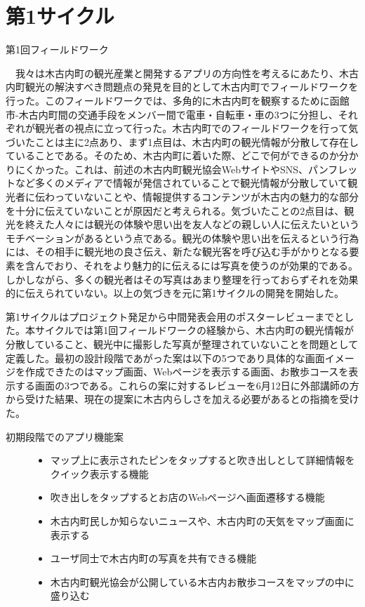 \section{第1サイクル}

\begin{description}
\item[第1回フィールドワーク]\mbox{}
\end{description}
　我々は木古内町の観光産業と開発するアプリの方向性を考えるにあたり、木古内町観光の解決すべき問題点の発見を目的として木古内町でフィールドワークを行った。このフィールドワークでは、多角的に木古内町を観察するために函館市-木古内町間の交通手段をメンバー間で電車・自転車・車の3つに分担し、それぞれが観光者の視点に立って行った。木古内町でのフィールドワークを行って気づいたことは主に2点あり、まず1点目は、木古内町の観光情報が分散して存在していることである。そのため、木古内町に着いた際、どこで何ができるのか分かりにくかった。これは、前述の木古内町観光協会WebサイトやSNS、パンフレットなど多くのメディアで情報が発信されていることで観光情報が分散していて観光者に伝わっていないことや、情報提供するコンテンツが木古内の魅力的な部分を十分に伝えていないことが原因だと考えられる。気づいたことの2点目は、観光を終えた人々には観光の体験や思い出を友人などの親しい人に伝えたいというモチベーションがあるという点である。観光の体験や思い出を伝えるという行為には、その相手に観光地の良さ伝え、新たな観光客を呼び込む手がかりとなる要素を含んでおり、それをより魅力的に伝えるには写真を使うのが効果的である。しかしながら、多くの観光者はその写真はあまり整理を行っておらずそれを効果的に伝えられていない。以上の気づきを元に第1サイクルの開発を開始した。

第1サイクルはプロジェクト発足から中間発表会用のポスターレビューまでとした。本サイクルでは第1回フィールドワークの経験から、木古内町の観光情報が分散していること、観光中に撮影した写真が整理されていないことを問題として定義した。最初の設計段階であがった案は以下の5つであり具体的な画面イメージを作成できたのはマップ画面、Webページを表示する画面、お散歩コースを表示する画面の3つである。これらの案に対するレビューを6月12日に外部講師の方から受けた結果、現在の提案に木古内らしさを加える必要があるとの指摘を受けた。
\begin{description}
\item[初期段階でのアプリ機能案]\mbox{}
\begin{itemize}
 \item マップ上に表示されたピンをタップすると吹き出しとして詳細情報をクイック表示する機能
 \item 吹き出しをタップするとお店のWebページへ画面遷移する機能
 \item 木古内町民しか知らないニュースや、木古内町の天気をマップ画面に表示する
 \item ユーザ同士で木古内町の写真を共有できる機能
 \item 木古内町観光協会が公開している木古内お散歩コースをマップの中に盛り込む
\end{itemize}
\end{description}

